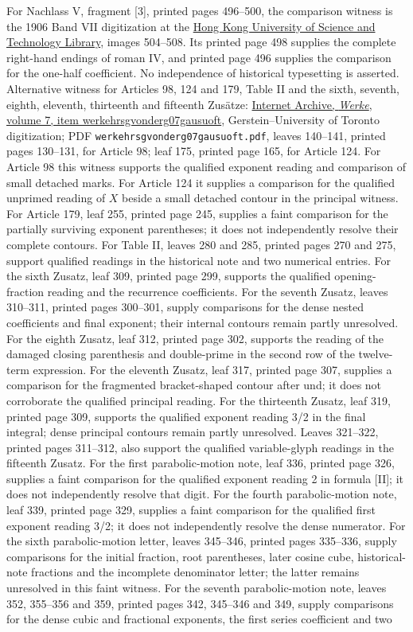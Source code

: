 For Nachlass V, fragment [3], printed pages 496–500, the comparison witness is the 1906 Band VII digitization at the \href{https://lbezone.hkust.edu.hk/bib/b761099}{Hong Kong University of Science and Technology Library}, images 504–508. Its printed page 498 supplies the complete right-hand endings of roman IV, and printed page 496 supplies the comparison for the one-half coefficient. No independence of historical typesetting is asserted.
 Alternative witness for Articles 98, 124 and 179, Table II and the sixth, seventh, eighth, eleventh, thirteenth and fifteenth Zusätze: \href{https://archive.org/details/werkehrsgvonderg07gausuoft}{Internet Archive, \emph{Werke}, volume 7, item werkehrsgvonderg07gausuoft}, Gerstein--University of Toronto digitization; PDF \texttt{werkehrsgvonderg07gausuoft.pdf}, leaves 140--141, printed pages 130--131, for Article 98; leaf 175, printed page 165, for Article 124. For Article 98 this witness supports the qualified exponent reading and comparison of small detached marks. For Article 124 it supplies a comparison for the qualified unprimed reading of \(X\) beside a small detached contour in the principal witness. For Article 179, leaf 255, printed page 245, supplies a faint comparison for the partially surviving exponent parentheses; it does not independently resolve their complete contours. For Table II, leaves 280 and 285, printed pages 270 and 275, support qualified readings in the historical note and two numerical entries. For the sixth Zusatz, leaf 309, printed page 299, supports the qualified opening-fraction reading and the recurrence coefficients. For the seventh Zusatz, leaves 310--311, printed pages 300--301, supply comparisons for the dense nested coefficients and final exponent; their internal contours remain partly unresolved. For the eighth Zusatz, leaf 312, printed page 302, supports the reading of the damaged closing parenthesis and double-prime in the second row of the twelve-term expression. For the eleventh Zusatz, leaf 317, printed page 307, supplies a comparison for the fragmented bracket-shaped contour after und; it does not corroborate the qualified principal reading. For the thirteenth Zusatz, leaf 319, printed page 309, supports the qualified exponent reading 3/2 in the final integral; dense principal contours remain partly unresolved. Leaves 321–322, printed pages 311–312, also support the qualified variable-glyph readings in the fifteenth Zusatz. For the first parabolic-motion note, leaf 336, printed page 326, supplies a faint comparison for the qualified exponent reading 2 in formula [II]; it does not independently resolve that digit. For the fourth parabolic-motion note, leaf 339, printed page 329, supplies a faint comparison for the qualified first exponent reading 3/2; it does not independently resolve the dense numerator. For the sixth parabolic-motion letter, leaves 345–346, printed pages 335–336, supply comparisons for the initial fraction, root parentheses, later cosine cube, historical-note fractions and the incomplete denominator letter; the latter remains unresolved in this faint witness. For the seventh parabolic-motion note, leaves 352, 355–356 and 359, printed pages 342, 345–346 and 349, supply comparisons for the dense cubic and fractional exponents, the first series coefficient and two 
